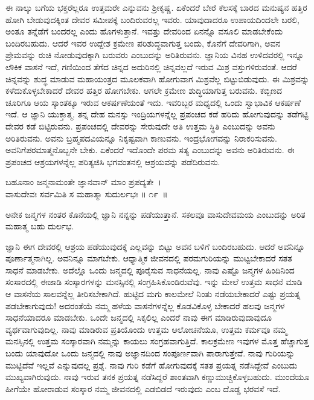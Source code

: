ಈ ನಾಲ್ಕು ಬಗೆಯ ಭಕ್ತರೆಲ್ಲರೂ ಉತ್ತಮರೇ ಎನ್ನುವನು ಶ‍್ರೀಕೃಷ್ಣ. ಏಕೆಂದರೆ ಬೇರೆ ಕೆಲಸಕ್ಕೆ ಬಾರದ ಮನುಷ್ಯನ ಹತ್ತಿರ ಹೋಗಿ ಬೇಡುವುದಕ್ಕಿಂತ ದೇವರ ಸಮೀಪಕ್ಕೆ ಬಂದಿರುವರಲ್ಲ ಇವರು. ಯಾವುದಾದರೂ ಉಪಾಯದಿಂದಲೇ ಬರಲಿ, ಅಂತೂ ತನ್ನೆಡೆಗೆ ಬಂದರಲ್ಲ ಎಂದು ಹೊಗಳುತ್ತಾನೆ. ಇವತ್ತು ದೇವರಿಂದ ಏನನ್ನೊ ವಸೂಲಿ ಮಾಡಬೇಕೆಂದು ಬಂದಿರಬಹುದು. ಆದರೆ ಇವರ ಉದ್ದೇಶ ಕ್ರಮೇಣ ಪರಿಶುದ್ಧವಾಗುತ್ತ ಬಂದು, ಕೊನೆಗೆ ದೇವರಿಗಾಗಿ, ಅವನ ಪ್ರೇಮವನ್ನು ರುಚಿ ನೋಡುವುದಕ್ಕಾಗಿ ಬರುವರು ಎಂಬುದನ್ನು ಅರಿತಿರುವನು. ಜ್ಞಾನಿಯ ವಿನಹ ಉಳಿದವರಲ್ಲಿ ಇನ್ನೂ ಲೌಕಿಕ ವಾಸನೆ ಇದೆ, ಗಣಿಯಿಂದ ತೆಗೆದ ಚಿನ್ನದ ಅದುರಿನಲ್ಲಿ ಚಿನ್ನವಲ್ಲದೆ ಇರುವ ಮಿಶ್ರ ವಸ್ತುಗಳಿರುವಂತೆ. ಆದರೆ ಚಿನ್ನವನ್ನು ಶುದ್ಧ ಮಾಡುವ ಮಹಾಯಂತ್ರದ ಮೂಲಕವಾಗಿ ಹೋಗುವಾಗ ಮಿಶ್ರವೆಲ್ಲ ಬಿಟ್ಟುಬಿಡುವುದು. ಈ ಮಿಶ್ರವನ್ನು ಕಳೆದುಕೊಳ್ಳಬೇಕಾದರೆ ದೇವರ ಹತ್ತಿರ ಹೋಗಬೇಕು. ಆಗಲೇ ಕ್ರಮೇಣ ಶುದ್ಧಿಯಾಗುತ್ತ ಬರುವನು. ಕಬ್ಬಿಣದ ಚೂರಿಗೂ ಆಯ ಸ್ಕಾಂತಕ್ಕೂ ಇರುವ ಆಕರ್ಷಣೆಯಂತೆ ಇದು. ಇವರಿಬ್ಬರ ಮಧ್ಯದಲ್ಲಿ ಒಂದು ಸ್ವಾಭಾವಿಕ ಆಕರ್ಷಣೆ ಇದೆ. ಆ ಜ್ಞಾನಿ ಯುಕ್ತಾತ್ಮ. ತನ್ನ ದೇಹ ಮನಸ್ಸು ಇಂದ್ರಿಯಗಳನ್ನೆಲ್ಲ ಪ್ರಪಂಚದ ಕಡೆ ಹರಿದು ಹೋಗುವುದನ್ನು ತಡೆಗಟ್ಟಿ ದೇವರ ಕಡೆ ಬಿಟ್ಟಿರುವನು. ಪ್ರಪಂಚದಲ್ಲಿ ದೇವರನ್ನು ಸೇರುವುದೇ ಅತಿ ಉತ್ತಮ ಸ್ಥಿತಿ ಎಂಬುದನ್ನು ಅವನು ಅರಿತಿರುವನು. ಅವನು ಬ್ರಹ್ಮಪದವಿಯನ್ನೂ ನಿಕೃಷ್ಟವಾಗಿ ಕಾಣುವನು. ಇಂದ್ರಭೋಗವನ್ನು ನಿರಾಕರಿಸುವನು. ಅವನಿಗೆ\break ಪರಮಾತ್ಮನೊಬ್ಬನೇ ಬೇಕು. ಏಕೆಂದರೆ ಇದೊಂದೇ ಪರಮ ಸತ್ಯ ಎಂಬುದನ್ನು ಅವನು ಅರಿತಿರುವನು. ಈ ಪ್ರಪಂಚದ ಆಶ್ರಯಗಳನ್ನೆಲ್ಲ ಪರಿತ್ಯಜಿಸಿ ಭಗವಂತನಲ್ಲಿ ಆಶ್ರಯವನ್ನು ಪಡೆದಿರುವನು.

\begin{shloka}
ಬಹೂನಾಂ ಜನ್ಮನಾಮಂತೇ ಜ್ಞಾನವಾನ್ ಮಾಂ ಪ್ರಪದ್ಯತೇ~।\\ವಾಸುದೇವಃ ಸರ್ವಮಿತಿ ಸ ಮಹಾತ್ಮಾ ಸುದುರ್ಲಭಃ \hfill॥ ೧೯~॥
\end{shloka}

\begin{artha}
ಅನೇಕ ಜನ್ಮಗಳ ನಂತರ ಕೊನೆಯಲ್ಲಿ ಜ್ಞಾನಿ ನನ್ನನ್ನು ಪಡೆಯುತ್ತಾನೆ. ಸಕಲವೂ ವಾಸುದೇವಮಯ ಎಂಬುದನ್ನು ಅರಿತ ಮಹಾತ್ಮ ಬಹು ದುರ್ಲಭ.
\end{artha}

ಜ್ಞಾನಿ ಈಗ ದೇವರಲ್ಲಿ ಆಶ್ರಯ ಪಡೆಯುವುದಕ್ಕೆ ಎಲ್ಲವನ್ನು ಬಿಟ್ಟು ಅವನ ಬಳಿಗೆ ಬಂದಿರಬಹುದು. ಆದರೆ ಅವನಿನ್ನೂ ಪೂರ್ಣಾತ್ಮನಾಗಿಲ್ಲ. ಅವನಿನ್ನೂ ಮಾಗಬೇಕು. ಆಧ್ಯಾತ್ಮಿಕ ಜೀವನದಲ್ಲಿ ಪರಮಗುರಿಯನ್ನು ಮುಟ್ಟಬೇಕಾದರೆ ಸತತ ಸಾಧನೆ ಮಾಡಬೇಕು. ಅದೆಲ್ಲೊ ಒಂದು ಜನ್ಮದಲ್ಲಿ ಪೂರೈಸುವ ಸಾಧನೆಯಲ್ಲ. ನಾವು ಎಷ್ಟೊ ಜನ್ಮಗಳ ಹಿಂದಿನಿಂದ ಸಂಸಾರದಲ್ಲಿ ಈಜಾಡಿ ಸಂಸ್ಕಾರಗಳನ್ನು ಮನಸ್ಸಿನಲ್ಲಿ ಸಂಗ್ರಹಿಸಿಕೊಂಡಿರುವೆವು. ಇನ್ನು ಮೇಲೆ ಉತ್ತಮ ಸಾಧನೆ ಮಾಡಿ ಆ ವಾಸನೆಯ ಸಾಲವನ್ನೆಲ್ಲ ತೀರಿಸಬೇಕಾಗಿದೆ. ಹುಟ್ಟಿದ ಮಗು ಕಾಲಮೇಲೆ ನಿಂತು ನಡೆಯಬೇಕಾದರೆ ಎಷ್ಟು ಪ್ರಯತ್ನ ಪಡಬೇಕಾಗುವುದು! ಅದರಂತೆಯೆ ನಮ್ಮ ಹಳೆಯ ವಾಸನೆಗಳನ್ನೆಲ್ಲ ಕೊಡವಿಕೊಳ್ಳ ಬೇಕಾದರೆ ಹಲವು ಜನ್ಮಗಳ ಸಾಧನೆಯಾದರೂ ಮಾಡಬೇಕು. ಒಂದೇ ಜನ್ಮದಲ್ಲಿ ಸಿಕ್ಕಲಿಲ್ಲ ಎಂದರೆ ನಾವು ಈಗ ಮಾಡಿರುವುದಾವುದೂ ವ್ಯರ್ಥವಾಗುವುದಿಲ್ಲ. ನಾವು ಮಾಡಿರುವ ಪ್ರತಿಯೊಂದು ಉತ್ತಮ ಆಲೋಚನೆಯೂ, ಉತ್ತಮ ಕರ್ಮವೂ ನಮ್ಮ ಮನಸ್ಸಿನಲ್ಲಿ ಉತ್ತಮ ಸಂಸ್ಕಾರವಾಗಿ ನಮ್ಮನ್ನು ಕಾಯಲು ಸಂಗ್ರಹವಾಗುತ್ತಿದೆ. ಕಾಲಕ್ರಮೇಣ ಇವುಗಳ ಮೊತ್ತ ಹೆಚ್ಚಾಗುತ್ತ ಬಂದು ಯಾವುದೋ ಒಂದು ಜನ್ಮದಲ್ಲಿ ನಾವು ಅಜ್ಞಾನದಿಂದ ಸಂಪೂರ್ಣವಾಗಿ ಪಾರಾಗುತ್ತೇವೆ. ನಾವು ಗುರಿಯನ್ನು ಮುಟ್ಟಿದೆವೆ ಇಲ್ಲವೆ ಎನ್ನುವುದಲ್ಲ ಪ್ರಶ್ನೆ. ನಾವು ಗುರಿ ಕಡೆಗೆ ಹೋಗುವುದಕ್ಕೆ ಸತತ ಪ್ರಯತ್ನ ನಡೆಸಿದ್ದೇವೆ ಎಂಬುದು ಮುಖ್ಯವಾಗಿರುವುದು. ನಾವು ಇರುವ ತನಕ ಪ್ರಯತ್ನ ನಡೆಸಿದ್ದರೆ ಶಾಂತವಾಗಿ ಕಣ್ಣುಮುಚ್ಚಿಕೊಳ್ಳಬಹುದು. ಮುಂದೆಯೂ ಹೀಗೆಯೇ ಹೋರಾಡುವ ಸಂಸ್ಕಾರ ನಮ್ಮ ಜೀವನದಲ್ಲಿ ಎಡಬಿಡದೆ ಇರುವುದು ಎಂಬ ದೊಡ್ಡ ಭರವಸೆ ಇದೆ.

